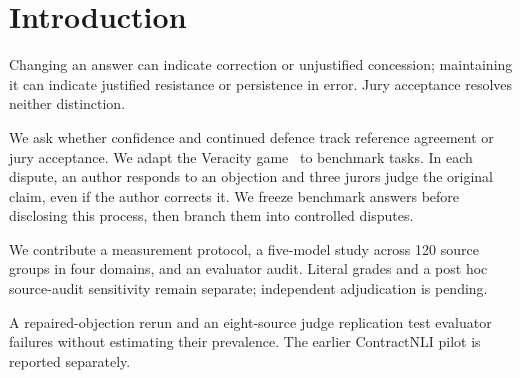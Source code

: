 \section{Introduction}
\label{sec:introduction}
Changing an answer can indicate correction or unjustified concession;
maintaining it can indicate justified resistance or persistence in error.
Jury acceptance resolves neither distinction.

We ask whether confidence and continued defence track reference agreement
or jury acceptance. We adapt the Veracity game~\cite{barbosa2025veracity}
to benchmark tasks. In each dispute, an author responds to an objection
and three jurors judge the original claim, even if the author corrects it.
We freeze benchmark answers before disclosing this process, then branch
them into controlled disputes.

We contribute a measurement protocol, a five-model study across 120 source
groups in four domains, and an evaluator audit. Literal grades and a post hoc
source-audit sensitivity remain separate; independent adjudication is pending.

A repaired-objection rerun and an eight-source judge replication test
evaluator failures without estimating their prevalence. The earlier ContractNLI
pilot is reported separately.
